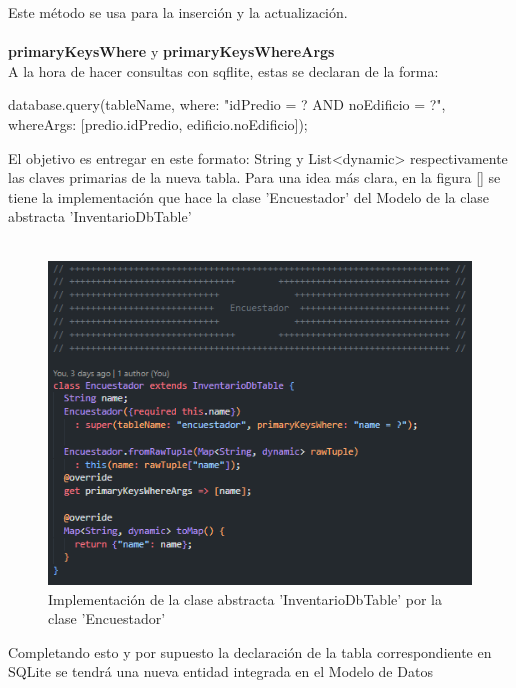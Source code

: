 Este método se usa para la inserción y la actualización.
\\\\
\textbf{primaryKeysWhere} y \textbf{primaryKeysWhereArgs}\\
A la hora de hacer consultas con sqflite, estas se declaran de la forma:
\begin{mdframed}
    database.query(tableName, where: "idPredio = ? AND noEdificio = ?", whereArgs: [predio.idPredio, edificio.noEdificio]);
\end{mdframed}
El objetivo es entregar en este formato: String y List<dynamic> respectivamente las claves primarias de la nueva tabla. Para una idea más clara, en la figura \ref{} se tiene la implementación que
hace la clase 'Encuestador' del Modelo de la clase abstracta 'InventarioDbTable'
\\\\
\begin{figure}[h]
    \centering
    \includegraphics[]{Graphics/Capitulo 3/implementacion_InventarioDBTable.png}
    \caption{Implementación de la clase abstracta 'InventarioDbTable' por la clase 'Encuestador'}
    \label{fig:figura17}
\end{figure}


Completando esto y por supuesto la declaración de la tabla correspondiente en SQLite se tendrá una nueva entidad integrada en el Modelo de Datos
\\
